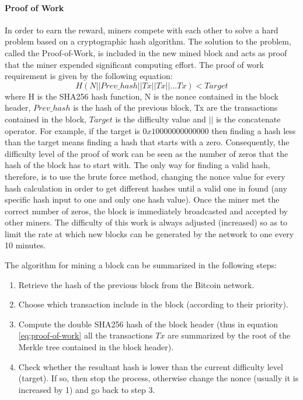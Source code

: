 \paragraph{Proof of Work} In order to earn the reward, miners compete with each
other to solve a hard problem based on a cryptographic hash algorithm. The
solution to the problem, called the Proof-of-Work, is included in the new mined
block and acts as proof that the miner expended significant computing effort.
The proof of work requirement is given by the following equation:
\begin{equation}\label{eq:proof-of-work}
  H ( N || Prev\_hash || Tx || Tx || . . . Tx) < Target
\end{equation} where H is the SHA256 hash function, N is the nonce
contained in the block header, $Prev\_hash$ is the hash of the previous block,
Tx are the transactions contained in the block, $Target$ is the difficulty
value and $||$ is the concatenate operator.
For example, if the target is $0x10000000000000$ then finding a hash less than
the target means finding a hash that starts with a zero. Consequently, the
difficulty level of the proof of work can be seen as the number of zeros that the
hash of the block has to start with. The only way for finding a valid hash, therefore,
is to use the brute force method, changing the nonce value for every hash
calculation in order to get different hashes until a valid one in found
(any specific hash input to one and only one hash value).
Once the miner met the correct number of zeros, the block is immediately
broadcasted and accepted by other miners.
The difficulty of this work is always adjusted (increased) so as to limit the
rate at which new blocks can be generated by the network to one every 10 minutes.

The algorithm for mining a block can be summarized in the following steps:
\begin{enumerate}
  \item Retrieve the hash of the previous block from the Bitcoin network.
  \item Choose which transaction include in the block (according to their priority).
  \item Compute the double SHA256 hash of the block header (thus in equation
  \ref{eq:proof-of-work} all the transactions $Tx$ are summarized by the root
  of the Merkle tree contained in the block header).
  \item Check whether the resultant hash is lower than the current difficulty level
  (target). If so, then stop the process, otherwise change the nonce (usually it is
  increased by 1) and go back to step 3.
\end{enumerate}
















